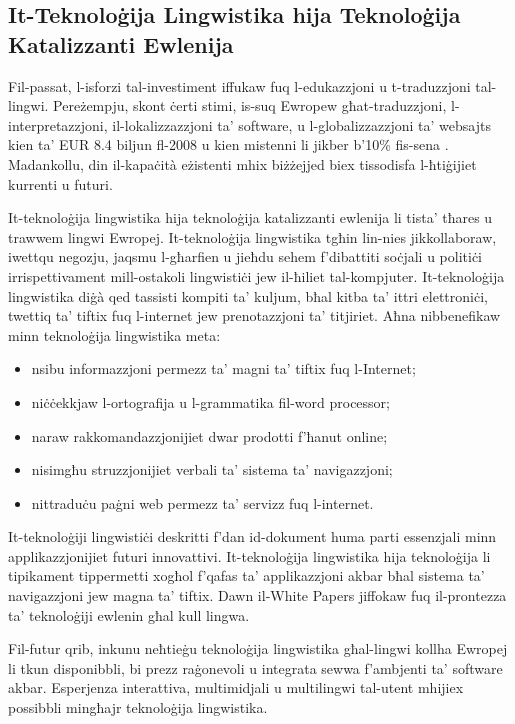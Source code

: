 \documentclass[]{../../metanetpaper}
\begin{document}
\begin{multicols}{2}
\subsection{It-Teknoloġija Lingwistika hija Teknoloġija Katalizzanti Ewlenija}

Fil-passat, l-isforzi tal-investiment iffukaw fuq l-edukazzjoni u t-traduzzjoni tal-lingwi. Pereżempju, skont ċerti stimi, is-suq Ewropew għat-traduzzjoni, l-interpretazzjoni, il-lokalizzazzjoni ta’ software, u l-globalizzazzjoni ta’ websajts kien ta' EUR 8.4 biljun fl-2008 u kien mistenni li jikber b’10\% fis-sena \cite{EC3}.  Madankollu, din il-kapaċità eżistenti mhix biżżejjed biex tissodisfa l-ħtiġijiet kurrenti u futuri.
  
It-teknoloġija lingwistika hija teknoloġija katalizzanti ewlenija li tista’ tħares u trawwem lingwi Ewropej. It-teknoloġija lingwistika tgħin lin-nies jikkollaboraw, iwettqu negozju, jaqsmu l-għarfien u jieħdu sehem f’dibattiti soċjali u politiċi irrispettivament mill-ostakoli lingwistiċi jew il-ħiliet tal-kompjuter. It-teknoloġija lingwistika diġà qed tassisti kompiti ta’ kuljum, bħal kitba ta’ ittri elettroniċi, twettiq ta’ tiftix fuq l-internet jew prenotazzjoni ta’ titjiriet. Aħna nibbenefikaw minn teknoloġija lingwistika meta:

\begin{itemize}
\item nsibu informazzjoni permezz ta’ magni ta’ tiftix fuq l-Internet; 
\item niċċekkjaw l-ortografija u l-grammatika fil-word processor;
\item naraw rakkomandazzjonijiet dwar prodotti f’ħanut online;
\item nisimgħu struzzjonijiet verbali ta’ sistema ta’ navigazzjoni;
\item nittraduċu paġni web permezz ta’ servizz fuq l-internet.
\end{itemize}

It-teknoloġiji lingwistiċi deskritti f'dan id-dokument huma parti essenzjali minn applikazzjonijiet futuri innovattivi. It-teknoloġija lingwistika hija teknoloġija li tipikament tippermetti xogħol f'qafas ta’ applikazzjoni akbar bħal sistema ta’ navigazzjoni jew magna ta’ tiftix. Dawn il-White Papers jiffokaw fuq il-prontezza ta’ teknoloġiji ewlenin għal kull lingwa.

  
Fil-futur qrib, inkunu neħtieġu teknoloġija lingwistika għal-lingwi kollha Ewropej li tkun disponibbli, bi prezz raġonevoli u integrata sewwa f’ambjenti ta’ software akbar. Esperjenza interattiva, multimidjali u multilingwi tal-utent mhijiex possibbli mingħajr teknoloġija lingwistika.


\end{multicols}
\end{document}
